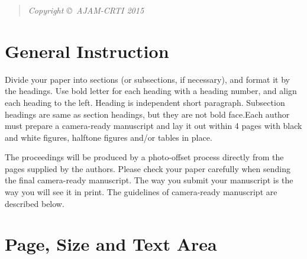 \documentclass[times,twocolumn,5p]{ajam}
\begin{document}
\begin{frontmatter}
\begin{abstract}
\begin{center}
{{{\textit{Copyright \copyright\ AJAM-CRTI 2015}}
} }
\end{center}
\end{abstract}


\end{frontmatter}

\linenumbers

\section{General Instruction}
\label{S:1}Divide your paper into sections (or subsections, if necessary), and format it by the headings. Use bold letter for each heading with a heading number, and align each heading to the left. Heading is independent short paragraph. Subsection headings are same as section headings, but they are not bold face.Each author must prepare a camera-ready manuscript and lay it out within 4 pages with black and white figures, halftone figures and/or tables in place. 

The proceedings will be produced by a photo-offset process directly from the pages supplied by the authors. Please check your paper carefully when sending the final camera-ready manuscript. The way you submit your manuscript is the way you will see it in print. The guidelines of camera-ready manuscript are described below.

\section{Page, Size and Text Area}
\end{document}
